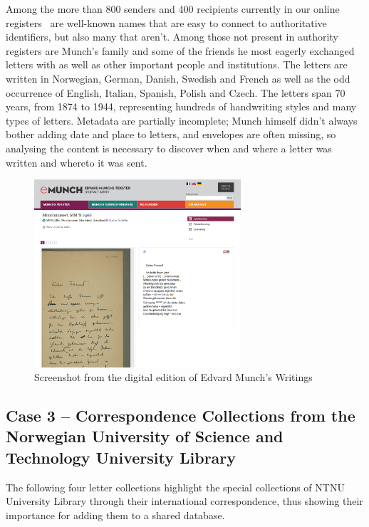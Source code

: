 \documentclass[runningheads]{llncs}
\begin{document}
Among the more than 800 senders and 400 recipients currently in our
online registers~\cite{ref_emunch} are well-known names that
are easy to connect to authoritative identifiers, but also many that
aren't. Among those not present in authority registers are Munch's
family and some of the friends he most eagerly exchanged letters with as
well as other important people and institutions. The letters are written
in Norwegian, German, Danish, Swedish and French as well as the odd
occurrence of English, Italian, Spanish, Polish and Czech. The letters
span 70 years, from 1874 to 1944, representing hundreds of handwriting
styles and many types of letters. Metadata are partially incomplete;
Munch himself didn't always bother adding date and place to letters, and
envelopes are often missing, so analysing the content is necessary to
discover when and where a letter was written and whereto it was sent.

\begin{figure}[h!]
\centering
\includegraphics[width=290]{emunch.png}
\caption{Screenshot from the digital edition of Edvard Munch's Writings} \label{fig5}
\end{figure}
\clearpage
\subsection{Case 3 -- Correspondence Collections from the Norwegian University of Science and Technology University Library}
The following four letter collections highlight the special collections
of NTNU University Library through their international correspondence,
thus showing their importance for adding them to a shared database.
\end{document}
